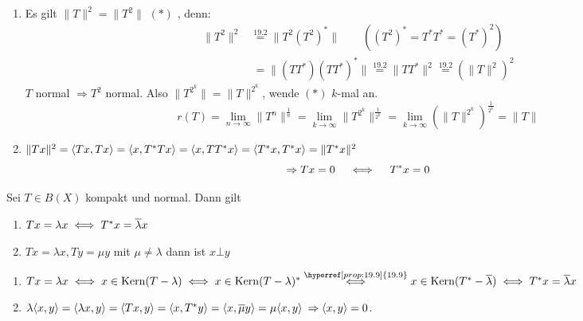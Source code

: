 \begin{beweis}
	\begin{enumerate}[label=\alph*\upshape)]
		\item Es gilt $\| T \|^{2} = \| T^{2} \|$ $(*)$ \label{prop:19.9.5-*}, denn:
			\begin{align*}
				\| T^{2} \|^{2} & \overset{\hyperref[bem:19.2]{19.2}}{=} \| T^{2} \left( T^{2} \right)^{*} \| \qquad \left((T^{2})^{*} = T^{*} T^{*} = (T^{*})^{2}\right) \\
					& ~= \| (T T^{*}) (T T^{*})^{*} \| \overset{\hyperref[bem:19.2]{19.2}}{=} \| T T^{*} \|^{2} \overset{\hyperref[bem:19.2]{19.2}}{=} \left( \| T \|^{2} \right)^{2}
			\end{align*}
			$T$ normal $\Rightarrow T^{2}$ normal. Also $\| T^{2^{k}} \| = \| T \|^{2^{k}}$, wende \hyperref[prop:19.9.5-*]{$(*)$} $k$-mal an. 
			\[ r(T) = \lim_{n \rightarrow \infty} \| T^{n} \|^{\frac{1}{n}} = \lim_{k \rightarrow \infty} \| T^{2^{k}} \|^{\frac{1}{2^{k}}} = \lim_{k \rightarrow \infty} \left( \| T \|^{2^{k}} \right)^{\frac{1}{2^{k}}} = \| T \| \]
		\item $\| T x \|^{2} = \langle T x , T x \rangle = \langle x , T^{*} T x \rangle = \langle x , T T^{*} x \rangle = \langle T	^{*} x , T^{*} x \rangle = \| T^{*} x \|^{2}$ \\
			\[ \Rightarrow T x = 0 \quad \iff \quad T^{*} x = 0 \]
	\end{enumerate}				
\end{beweis}


\begin{lemma}
	Sei $T \in B(X)$ kompakt und normal. Dann gilt
	\begin{enumerate}
		\item $T x = \lambda x \iff T^{*} x = \overline{\lambda} x$
		\item $T x = \lambda x, T y = \mu y$ mit $\mu \neq \lambda$  dann ist $x \bot y$
	\end{enumerate}
\end{lemma}

\begin{beweis}
	\begin{enumerate}[label=\alph*\upshape)]
		\item $T x = \lambda x \gdw x \in \kernn(T - \lambda) \gdw x \in \kernn(T - \lambda)^{*} \overset{\hyperref[prop:19.9]{19.9}}{\gdw} x \in \kernn(T^{*} - \overline{\lambda}) \gdw T^{*} x = \overline{\lambda} x$
		\item $\lambda \langle x , y \rangle = \langle \lambda x , y \rangle = \langle T x , y \rangle = \langle x , T^{*} y \rangle = \langle x , \overline{\mu} y \rangle = \mu \langle x, y \rangle$ $\Rightarrow \langle x , y \rangle = 0$.
	\end{enumerate}	
\end{beweis}


	
\newpage